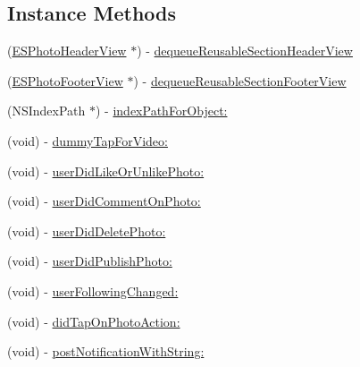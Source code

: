 \subsection*{Instance Methods}
\begin{DoxyCompactItemize}
\item 
(\hyperlink{interface_e_s_photo_header_view}{E\+S\+Photo\+Header\+View} $\ast$) -\/ \hyperlink{interface_e_s_photo_timeline_account_view_controller_a067f57d7ee178c31e7ab59a2530aa698}{dequeue\+Reusable\+Section\+Header\+View}
\item 
(\hyperlink{interface_e_s_photo_footer_view}{E\+S\+Photo\+Footer\+View} $\ast$) -\/ \hyperlink{interface_e_s_photo_timeline_account_view_controller_a3e9d2470e6c77d2b7665200c3855a35a}{dequeue\+Reusable\+Section\+Footer\+View}
\item 
(N\+S\+Index\+Path $\ast$) -\/ \hyperlink{interface_e_s_photo_timeline_account_view_controller_a8f33342aa2355ac2fabbd52d3ebb7e39}{index\+Path\+For\+Object\+:}
\item 
(void) -\/ \hyperlink{interface_e_s_photo_timeline_account_view_controller_ad08633bb0bf3a6cc2a6359d42eafae27}{dummy\+Tap\+For\+Video\+:}
\item 
(void) -\/ \hyperlink{interface_e_s_photo_timeline_account_view_controller_ac2ed3256fa10d1a208f1001883f97f92}{user\+Did\+Like\+Or\+Unlike\+Photo\+:}
\item 
(void) -\/ \hyperlink{interface_e_s_photo_timeline_account_view_controller_a03ada240fc7b6d8b5d9aa88cefd9e509}{user\+Did\+Comment\+On\+Photo\+:}
\item 
(void) -\/ \hyperlink{interface_e_s_photo_timeline_account_view_controller_ac06df468e07aa7b0168a31aac3a6c8d3}{user\+Did\+Delete\+Photo\+:}
\item 
(void) -\/ \hyperlink{interface_e_s_photo_timeline_account_view_controller_a65cbfacefc7b092921b3141bc2d58ff6}{user\+Did\+Publish\+Photo\+:}
\item 
(void) -\/ \hyperlink{interface_e_s_photo_timeline_account_view_controller_a7075e42fa5451c69bb3b1e5c36883fd1}{user\+Following\+Changed\+:}
\item 
(void) -\/ \hyperlink{interface_e_s_photo_timeline_account_view_controller_a7392394a8d590b53d217cea1c0f547e9}{did\+Tap\+On\+Photo\+Action\+:}
\item 
(void) -\/ \hyperlink{interface_e_s_photo_timeline_account_view_controller_ab25cbb02695687f498994e97c72a411d}{post\+Notification\+With\+String\+:}
\end{DoxyCompactItemize}
